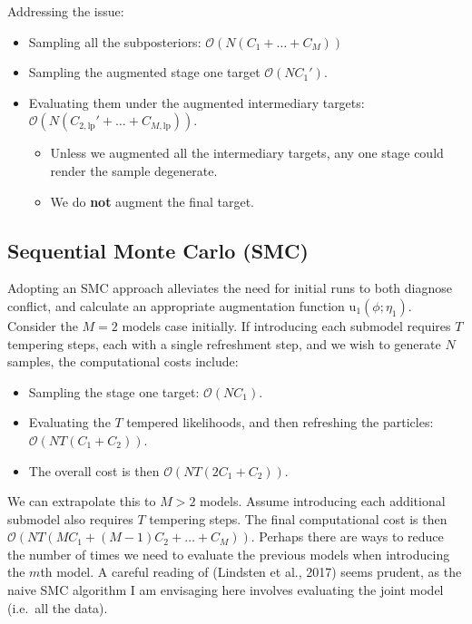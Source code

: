 \documentclass[10pt,a4paper,]{article}
\providecommand{\tightlist}{%
  \setlength{\itemsep}{0pt}\setlength{\parskip}{0pt}}
\newcommand{\tarw}{\text{u}}
\newcommand{\Nx}{N}
\newcommand{\Nm}{M}
\newcommand{\modelindex}{m}
\begin{document}
Addressing the issue:

\begin{itemize}
\tightlist
\item
  Sampling all the subposteriors:
  \(\mathcal{O}(\Nx (C_{1} + \ldots + C_{\Nm}))\)
\item
  Sampling the augmented stage one target \(\mathcal{O}(\Nx C_{1}')\).
\item
  Evaluating them under the augmented intermediary targets:
  \(\mathcal{O}(\Nx (C_{2, \text{lp}}' + \ldots + C_{\Nm, \text{lp}}))\).

  \begin{itemize}
  \tightlist
  \item
    Unless we augmented all the intermediary targets, any one stage
    could render the sample degenerate.
  \item
    We do \textbf{not} augment the final target.
  \end{itemize}
\end{itemize}

\subsection{Sequential Monte Carlo
(SMC)}\label{sequential-monte-carlo-smc}

Adopting an SMC approach alleviates the need for initial runs to both
diagnose conflict, and calculate an appropriate augmentation function
\(\tarw_{1}(\phi; \eta_{1})\). Consider the \(\Nm = 2\) models case
initially. If introducing each submodel requires \(T\) tempering steps,
each with a single refreshment step, and we wish to generate \(\Nx\)
samples, the computational costs include:

\begin{itemize}
\tightlist
\item
  Sampling the stage one target: \(\mathcal{O}(\Nx C_{1})\).
\item
  Evaluating the \(T\) tempered likelihoods, and then refreshing the
  particles: \(\mathcal{O}(\Nx T (C_{1} + C_{2}))\). 
\item
  The overall cost is then \(\mathcal{O}(\Nx T (2 C_{1} + C_{2}))\).
\end{itemize}

We can extrapolate this to \(\Nm > 2\) models. Assume introducing each
additional submodel also requires \(T\) tempering steps. The final
computational cost is then
\(\mathcal{O}(\Nx T (\Nm C_{1} + (\Nm - 1) C_{2} + \ldots + C_{\Nm}))\).
Perhaps there are ways to reduce the number of times we need to evaluate
the previous models when introducing the \(\modelindex\)th model. A
careful reading of (Lindsten et al., 2017) seems prudent, as the naive
SMC algorithm I am envisaging here involves evaluating the joint model
(i.e.~all the data).
\end{document}
